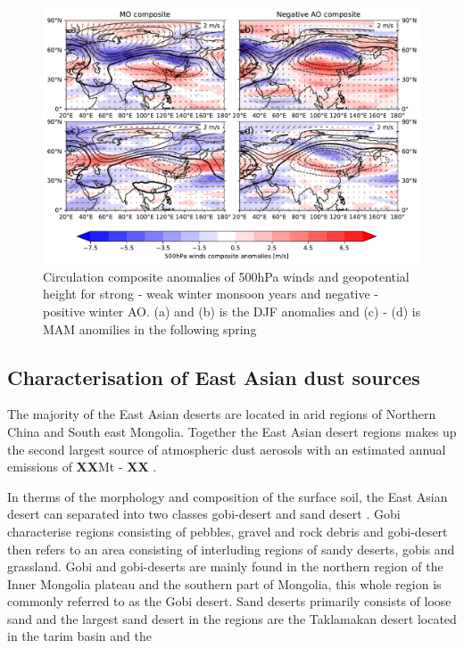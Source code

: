 \begin{figure}[htbp]
    \centering
    \includegraphics[width=\textwidth]{texfiles/figs/winter_MO_AO_composite_500h.pdf}
    \caption{Circulation composite anomalies of 500hPa winds and geopotential height for strong - weak winter monsoon years and negative - positive winter AO. (a) and (b) is the DJF anomalies and (c) - (d) is MAM anomilies in the following spring}
    \label{fig:mo_ao_composite_500hPa}
\end{figure}

\subsection{Characterisation of East Asian dust sources}
The majority of the East Asian deserts are located in arid regions of Northern China and South east Mongolia. Together the East Asian desert regions makes up the second largest source of atmospheric dust aerosols \parencite{chen2017overview} with an estimated annual emissions of \textbf{XX}Mt - \textbf{XX} . 


In therms of the morphology and composition of the surface soil, the East Asian desert can separated into two classes gobi-desert and sand desert \parencite{xuan2002characterization}. Gobi characterise regions consisting of pebbles, gravel and rock debris and gobi-desert then refers to an area consisting of interluding regions of sandy deserts, gobis and grassland. Gobi and gobi-deserts are mainly found in the northern region of the Inner Mongolia plateau and the southern part of Mongolia, this whole region is commonly referred to as the Gobi desert. Sand deserts primarily consists of loose sand and the largest sand desert in the regions are the Taklamakan desert located in the tarim basin and the    


